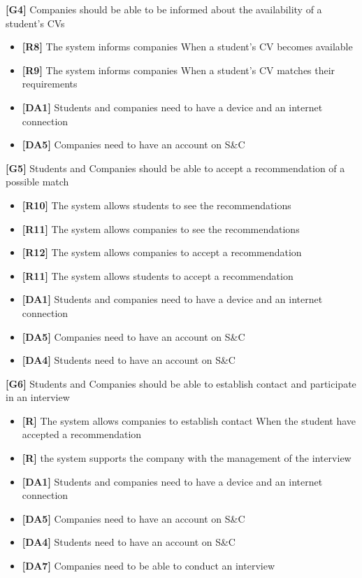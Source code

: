 \textbf{[G4]} Companies should be able to be informed about the availability of a student's CVs
\begin{itemize}
    \item \textbf{[R8]} The system informs companies When a student’s CV becomes available
    \item \textbf{[R9]} The system informs companies When a student’s CV matches their requirements

    \item \textbf{[DA1]} Students and companies need to have a device and an internet connection
    \item \textbf{[DA5]} Companies need to have an account on S\&C
\end{itemize}

\textbf{[G5]} Students and Companies should be able to accept a recommendation of a possible match
\begin{itemize}
    \item \textbf{[R10]} The system allows students to see the recommendations
    \item \textbf{[R11]} The system allows companies to see the recommendations
    \item \textbf{[R12]} The system allows companies to accept a recommendation
    \item \textbf{[R11]} The system allows students to accept a recommendation

    \item \textbf{[DA1]} Students and companies need to have a device and an internet connection
    \item \textbf{[DA5]} Companies need to have an account on S\&C
    \item \textbf{[DA4]} Students need to have an account on S\&C
\end{itemize}

\textbf{[G6]} Students and Companies should be able to establish contact and participate in an interview
\begin{itemize}
    \item \textbf{[R]} The system allows companies to establish contact When the student have accepted
    a recommendation
    \item \textbf{[R]} the system supports the company with the management of the interview

    \item \textbf{[DA1]} Students and companies need to have a device and an internet connection
    \item \textbf{[DA5]} Companies need to have an account on S\&C
    \item \textbf{[DA4]} Students need to have an account on S\&C
    \item \textbf{[DA7]} Companies need to be able to conduct an interview
\end{itemize}

